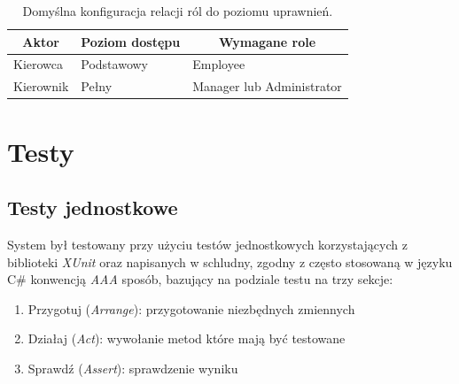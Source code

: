 \documentclass[eng,printmode,openany]{mgr}
\begin{document}
	\begin{table}[H]
		\caption{Domyślna konfiguracja relacji ról do poziomu uprawnień.}
		\begin{tabularx}{\textwidth}{|l|l|X|}
			\hline
			\multicolumn{1}{|c|}{\textbf{Aktor}} & \multicolumn{1}{c|}{\textbf{Poziom dostępu}} & \multicolumn{1}{c|}{\textbf{Wymagane role}} \\ \hline
			Kierowca                             & Podstawowy                                   & Employee                                    \\ \hline
			Kierownik                            & Pełny                                        & Manager lub Administrator                   \\ \hline
		\end{tabularx}
	\end{table}
	
	
	\newpage
	\chapter{Testy}
	\section{Testy jednostkowe}
	System był testowany przy użyciu testów jednostkowych korzystających z biblioteki \textit{XUnit} oraz napisanych w schludny, zgodny z często stosowaną w języku C\# konwencją \textit{AAA} sposób, bazujący na podziale testu na trzy sekcje:
	\begin{enumerate}
		\item Przygotuj (\textit{Arrange}): przygotowanie niezbędnych zmiennych
		\item Działaj (\textit{Act}): wywołanie metod które mają być testowane 
		\item Sprawdź (\textit{Assert}): sprawdzenie wyniku 
	\end{enumerate}
	
\end{document}
